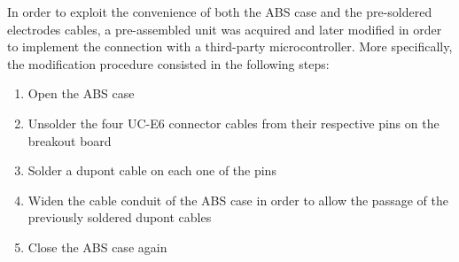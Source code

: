 In order to exploit the convenience of both the ABS case and the pre-soldered electrodes cables, a pre-assembled unit was acquired and later modified in order to implement the connection with a third-party microcontroller. More specifically, the modification procedure consisted in the following steps: 

\begin{enumerate}
    \item Open the ABS case
    \item Unsolder the four UC-E6 connector cables from their respective pins on the breakout board
    \item Solder a dupont cable on each one of the pins
    \item Widen the cable conduit of the ABS case in order to allow the passage of the previously soldered dupont cables
    \item Close the ABS case again
\end{enumerate}







